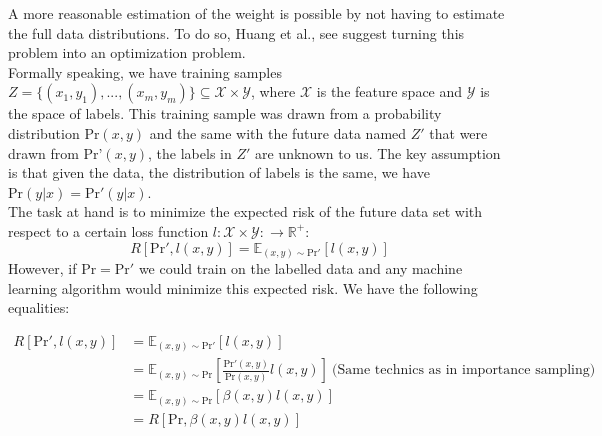 \documentclass{article}
\newcommand{\PR}{\text{Pr}}
\begin{document}
A more reasonable estimation of the weight is possible by not having to estimate the full data distributions. To do so, Huang et al., see \cite{KMM} suggest turning this problem into an optimization problem. \\
Formally speaking, we have training samples $Z=\lbrace (x_1,y_1),...,(x_m,y_m) \rbrace \subseteq \mathcal{X} \times \mathcal{Y}$, where $\mathcal{X}$ is the feature space and $\mathcal{Y}$ is the space of labels. This training sample was drawn from a probability distribution $\text{Pr}(x,y)$ and the same with the future data named $Z'$ that were drawn from $\text{Pr'}(x,y)$, the labels in $Z'$ are unknown to us. The key assumption is that given the data, the distribution of labels is the same, we have $\PR(y|x)=\PR'(y|x)$. \\
The task at hand is to minimize the expected risk of the future data set with respect to a certain loss function $l:\mathcal{X}\times\mathcal{Y}:\rightarrow \mathbb{R}^+$:
$$ R[\PR',l(x,y)]=\mathbb{E}_{(x,y)\sim \PR'}[l(x,y)]$$
However, if $\PR=\PR'$ we could train on the labelled data and any machine learning algorithm would minimize this expected risk. We have the following equalities:

\begin{align*}
R[\PR',l(x,y)] &= \mathbb{E}_{(x,y)\sim\PR'}[l(x,y)] \\
               &= \mathbb{E}_{(x,y)\sim\PR}[\frac{\PR'(x,y)}{\PR(x,y)}l(x,y)] \ \text{(Same \ technics \ as \ in \ importance \ sampling)}\\ 
               &= \mathbb{E}_{(x,y)\sim\PR}[\beta(x,y)l(x,y)] \\
               &= R[\PR,\beta(x,y)l(x,y)]
\end{align*}
\end{document}
